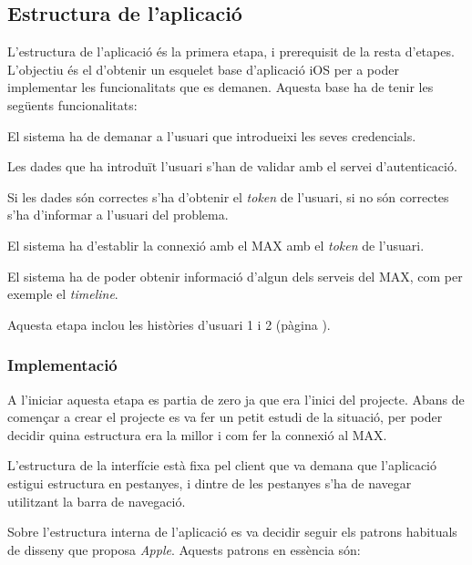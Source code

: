 \subsection{Estructura de l'aplicació}
\label{sec:etapa1}

L'estructura de l'aplicació és la primera etapa, i prerequisit de la resta d'etapes. L'objectiu és el d'obtenir un esquelet base d'aplicació iOS per a poder implementar les funcionalitats que es demanen.
Aquesta base ha de tenir les següents funcionalitats:

\begin{compactitem}
    \item El sistema ha de demanar a l'usuari que introdueixi les seves credencials.
    \item Les dades que ha introduït l'usuari s'han de validar amb el servei d'autenticació.
    \item Si les dades són correctes s'ha d'obtenir el \textit{token} de l'usuari, si no són correctes s'ha d'informar a l'usuari del problema.
    \item El sistema ha d'establir la connexió amb el MAX amb el \textit{token} de l'usuari.
    \item El sistema ha de poder obtenir informació d'algun dels serveis del MAX, com per exemple el \textit{timeline}.
\end{compactitem}

Aquesta etapa inclou les històries d'usuari 1 i 2 (pàgina \pageref{sec:historia_1}).

\subsubsection{Implementació}
A l'iniciar aquesta etapa es partia de zero ja que era l'inici del projecte. Abans de començar a crear el projecte es va fer un petit estudi de la situació, per poder decidir quina estructura era la millor i com fer la connexió al MAX.

L'estructura de la interfície està fixa pel client que va demana que l'aplicació estigui estructura en pestanyes, i dintre de les pestanyes s'ha de navegar utilitzant la barra de navegació. 

Sobre l'estructura interna de l'aplicació es va decidir seguir els patrons habituals de disseny que proposa \textit{Apple}\cite{apple_disseny}. Aquests patrons en essència són:

